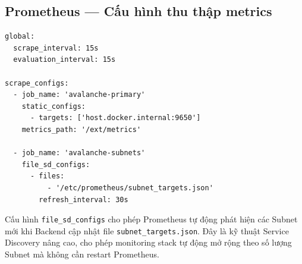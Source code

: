\subsection{Prometheus --- Cấu hình thu thập metrics}

\begin{lstlisting}[caption={prometheus.yml --- Cấu hình scrape targets}, label={lst:prometheus_config}, language={}]
global:
  scrape_interval: 15s
  evaluation_interval: 15s

scrape_configs:
  - job_name: 'avalanche-primary'
    static_configs:
      - targets: ['host.docker.internal:9650']
    metrics_path: '/ext/metrics'

  - job_name: 'avalanche-subnets'
    file_sd_configs:
      - files:
          - '/etc/prometheus/subnet_targets.json'
        refresh_interval: 30s
\end{lstlisting}

Cấu hình \texttt{file\_sd\_configs} cho phép Prometheus tự động phát hiện các Subnet mới khi Backend cập nhật file \texttt{subnet\_targets.json}. Đây là kỹ thuật Service Discovery nâng cao, cho phép monitoring stack tự động mở rộng theo số lượng Subnet mà không cần restart Prometheus.
